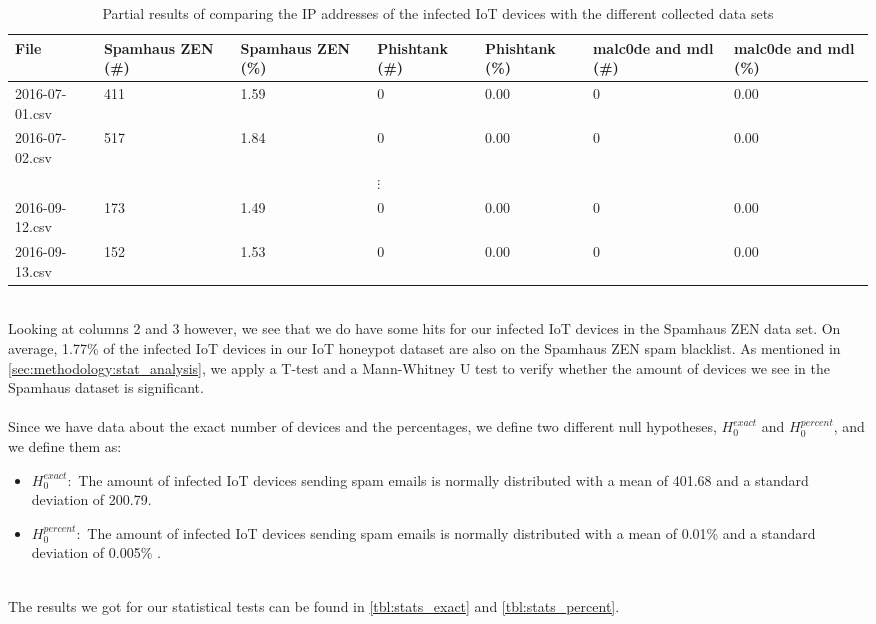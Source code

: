 \documentclass[a4paper,10pt]{article}
\begin{document}
\begin{table}[h]
 \begin{tabularx}{\linewidth}{lXXXXXX}
 \toprule
 File & Spamhaus ZEN (\#) & Spamhaus ZEN (\%) & Phishtank (\#) &  Phishtank (\%) & malc0de and mdl (\#) & malc0de and mdl (\%) \\
 \midrule
 2016-07-01.csv & 411 & 1.59 & 0 & 0.00 & 0 & 0.00 \\
 2016-07-02.csv & 517 & 1.84 & 0 & 0.00 & 0 & 0.00 \\
 &  &  & $\vdots$ &  &  &  \\
2016-09-12.csv & 173 & 1.49 & 0 & 0.00 & 0 & 0.00 \\
2016-09-13.csv & 152 & 1.53 & 0 & 0.00 & 0 & 0.00 \\
 \bottomrule
 \end{tabularx}
 \caption{Partial results of comparing the IP addresses of the infected IoT devices with the different collected data sets}
 \label{tbl:results_partial}
\end{table}
~\\
Looking at columns 2 and 3 however, we see that we do have some hits for our  infected IoT devices in the Spamhaus
ZEN data set. On average, 1.77\% of the infected IoT devices in our IoT honeypot dataset are also on the Spamhaus ZEN
spam blacklist. As mentioned in \autoref{sec:methodology:stat_analysis}, we apply a T-test  and a Mann-Whitney U test
to verify whether the amount of devices we see in the Spamhaus dataset is significant. 
\\\\
Since we have data about the exact number of devices and the percentages, we define two different null hypotheses, 
$H_0^{exact}$ and $H_0^{percent}$, and we define them as:
\begin{itemize}
 \item[] $H_0^{exact}:$ The amount of infected IoT devices sending spam emails is normally distributed with a mean 
 of 401.68 and  a standard deviation of 200.79.
 \item[] $H_0^{percent}:$ The amount of infected IoT devices sending spam emails is normally distributed with a mean 
 of 0.01\% and  a standard deviation of 0.005\% .
\end{itemize}
~\\
The results we got for our statistical tests can be found in \autoref{tbl:stats_exact} and \autoref{tbl:stats_percent}.
\end{document}
